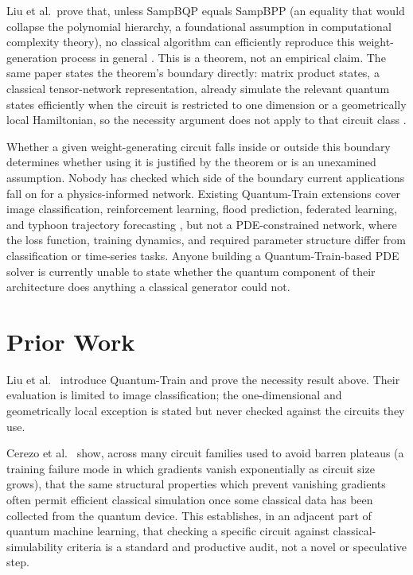 \documentclass[10pt,a4paper]{article}
\begin{document}
Liu et al.\ prove that, unless SampBQP equals SampBPP (an equality that would collapse the polynomial hierarchy, a foundational assumption in computational complexity theory), no classical algorithm can efficiently reproduce this weight-generation process in general \cite{liu2024}. This is a theorem, not an empirical claim. The same paper states the theorem's boundary directly: matrix product states, a classical tensor-network representation, already simulate the relevant quantum states efficiently when the circuit is restricted to one dimension or a geometrically local Hamiltonian, so the necessity argument does not apply to that circuit class \cite{liu2024}.

Whether a given weight-generating circuit falls inside or outside this boundary determines whether using it is justified by the theorem or is an unexamined assumption. Nobody has checked which side of the boundary current applications fall on for a physics-informed network. Existing Quantum-Train extensions cover image classification, reinforcement learning, flood prediction, federated learning, and typhoon trajectory forecasting \cite{liu2025typhoon}, but not a PDE-constrained network, where the loss function, training dynamics, and required parameter structure differ from classification or time-series tasks. Anyone building a Quantum-Train-based PDE solver is currently unable to state whether the quantum component of their architecture does anything a classical generator could not.

\section{Prior Work}

Liu et al.\ \cite{liu2024} introduce Quantum-Train and prove the necessity result above. Their evaluation is limited to image classification; the one-dimensional and geometrically local exception is stated but never checked against the circuits they use.

Cerezo et al.\ \cite{cerezo2025} show, across many circuit families used to avoid barren plateaus (a training failure mode in which gradients vanish exponentially as circuit size grows), that the same structural properties which prevent vanishing gradients often permit efficient classical simulation once some classical data has been collected from the quantum device. This establishes, in an adjacent part of quantum machine learning, that checking a specific circuit against classical-simulability criteria is a standard and productive audit, not a novel or speculative step.
\end{document}
